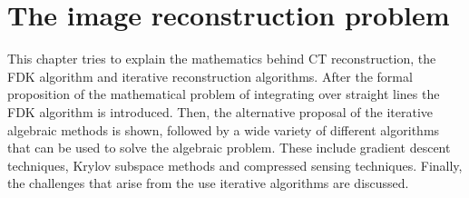\chapter{The image reconstruction problem}


This chapter tries to explain the mathematics behind CT reconstruction, the FDK algorithm and iterative reconstruction algorithms. After the formal proposition of the mathematical problem of integrating over straight lines the FDK algorithm is introduced. Then, the alternative proposal of the iterative algebraic methods is shown, followed by a wide variety of different algorithms that can be used to solve the algebraic problem. These include gradient descent techniques, Krylov subspace methods and compressed sensing techniques. Finally, the challenges that arise from the use iterative algorithms are discussed.  

